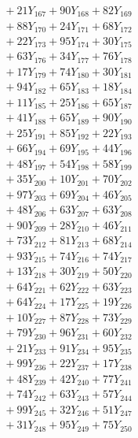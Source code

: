 \documentclass[a4paper,10pt]{article}
\begin{document}
{\begin{align}
&\;  + 21 Y_{167} + 90 Y_{168} + 82 Y_{169} \\[0.3ex]
&\;  + 88 Y_{170} + 24 Y_{171} + 68 Y_{172} \\[0.3ex]
&\;  + 22 Y_{173} + 95 Y_{174} + 30 Y_{175} \\[0.3ex]
&\;  + 63 Y_{176} + 34 Y_{177} + 76 Y_{178} \\[0.5ex]\allowbreak
&\;  + 17 Y_{179} + 74 Y_{180} + 30 Y_{181} \\[0.3ex]
&\;  + 94 Y_{182} + 65 Y_{183} + 18 Y_{184} \\[0.3ex]
&\;  + 11 Y_{185} + 25 Y_{186} + 65 Y_{187} \\[0.3ex]
&\;  + 41 Y_{188} + 65 Y_{189} + 90 Y_{190} \\[0.3ex]
&\;  + 25 Y_{191} + 85 Y_{192} + 22 Y_{193} \\[0.3ex]
&\;  + 66 Y_{194} + 69 Y_{195} + 44 Y_{196} \\[0.3ex]
&\;  + 48 Y_{197} + 54 Y_{198} + 58 Y_{199} \\[0.3ex]
&\;  + 35 Y_{200} + 10 Y_{201} + 70 Y_{202} \\[0.3ex]
&\;  + 97 Y_{203} + 69 Y_{204} + 46 Y_{205} \\[0.3ex]
&\;  + 48 Y_{206} + 63 Y_{207} + 63 Y_{208} \\[0.5ex]\allowbreak
&\;  + 90 Y_{209} + 28 Y_{210} + 46 Y_{211} \\[0.3ex]
&\;  + 73 Y_{212} + 81 Y_{213} + 68 Y_{214} \\[0.3ex]
&\;  + 93 Y_{215} + 74 Y_{216} + 74 Y_{217} \\[0.3ex]
&\;  + 13 Y_{218} + 30 Y_{219} + 50 Y_{220} \\[0.3ex]
&\;  + 64 Y_{221} + 62 Y_{222} + 63 Y_{223} \\[0.3ex]
&\;  + 64 Y_{224} + 17 Y_{225} + 19 Y_{226} \\[0.3ex]
&\;  + 10 Y_{227} + 87 Y_{228} + 73 Y_{229} \\[0.3ex]
&\;  + 79 Y_{230} + 96 Y_{231} + 60 Y_{232} \\[0.3ex]
&\;  + 21 Y_{233} + 91 Y_{234} + 95 Y_{235} \\[0.3ex]
&\;  + 99 Y_{236} + 22 Y_{237} + 17 Y_{238} \\[0.5ex]\allowbreak
&\;  + 48 Y_{239} + 42 Y_{240} + 77 Y_{241} \\[0.3ex]
&\;  + 74 Y_{242} + 63 Y_{243} + 57 Y_{244} \\[0.3ex]
&\;  + 99 Y_{245} + 32 Y_{246} + 51 Y_{247} \\[0.3ex]
&\;  + 31 Y_{248} + 95 Y_{249} + 75 Y_{250} \\[0.3ex]

\end{align}}
\end{document}
